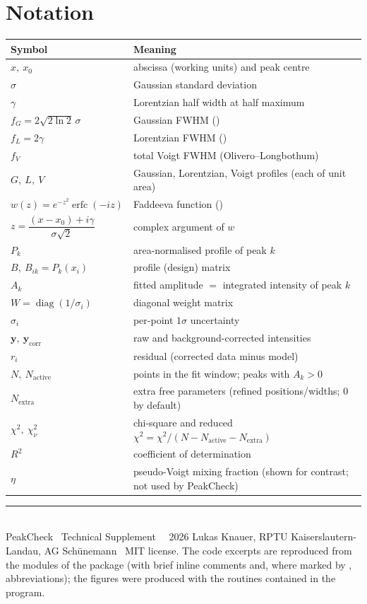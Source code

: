 \documentclass[11pt,a4paper]{article}
\begin{document}
\section{Notation}
\begin{table}[h]\small\centering
\begin{tabularx}{\linewidth}{@{}l L@{}}
\toprule
\textbf{Symbol} & \textbf{Meaning}\\
\midrule
$x,\ x_0$ & abscissa (working units) and peak centre\\
$\sigma$ & Gaussian standard deviation\\
$\gamma$ & Lorentzian half width at half maximum\\
$f_G = 2\sqrt{2\ln 2}\,\sigma$ & Gaussian FWHM ()\\
$f_L = 2\gamma$ & Lorentzian FWHM ()\\
$f_V$ & total Voigt FWHM (Olivero--Longbothum)\\
$G,\ L,\ V$ & Gaussian, Lorentzian, Voigt profiles (each of unit area)\\
$w(z) = e^{-z^2}\operatorname{erfc}(-iz)$ & Faddeeva function ()\\
$z = \dfrac{(x-x_0)+i\gamma}{\sigma\sqrt 2}$ & complex argument of $w$\\
$P_k$ & area-normalised profile of peak $k$\\
$B,\ B_{ik}=P_k(x_i)$ & profile (design) matrix\\
$A_k$ & fitted amplitude $=$ integrated intensity of peak $k$\\
$W=\operatorname{diag}(1/\sigma_i)$ & diagonal weight matrix\\
$\sigma_i$ & per-point $1\sigma$ uncertainty\\
$\mathbf{y},\ \mathbf{y}_\text{corr}$ & raw and background-corrected intensities\\
$r_i$ & residual (corrected data minus model)\\
$N,\ N_\text{active}$ & points in the fit window; peaks with $A_k>0$\\
$N_\text{extra}$ & extra free parameters (refined positions/widths; $0$ by default)\\
$\chi^2,\ \chi^2_\nu$ & chi-square and reduced $\chi^2 = \chi^2/(N-N_\text{active}-N_\text{extra})$\\
$R^2$ & coefficient of determination\\
$\eta$ & pseudo-Voigt mixing fraction (shown for contrast; not used by PeakCheck)\\
\bottomrule
\end{tabularx}
\end{table}

\bigskip
\noindent\rule{\linewidth}{0.4pt}\\[2pt]
{\footnotesize PeakCheck \textperiodcentered\ Technical Supplement \textperiodcentered\
\textcopyright\ 2026 Lukas Knauer, RPTU Kaiserslautern-Landau, AG Sch\"unemann
\textperiodcentered\ MIT license. The code excerpts are reproduced from the
modules of the \code{peakcheck} package (with brief inline comments and, where
marked by \code{...}, abbreviations); the figures were produced with the routines
contained in the program.}
\end{document}
